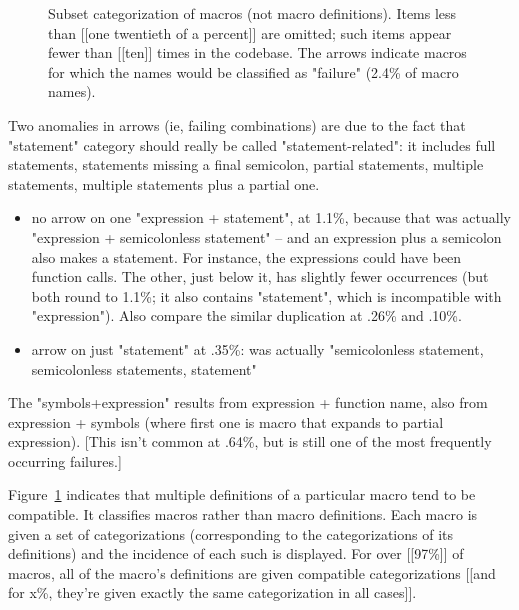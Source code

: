 \documentclass[10pt]{article}
\begin{document}
\begin{figure}
  {\small\centerline{}}
  \caption{Subset categorization of macros (not macro definitions).   Items
    less than [[one twentieth of a percent]] are omitted; such items appear
    fewer than [[ten]] times in the codebase.
    The arrows indicate macros for which the names would be classified
    as "failure" (2.4\% of macro names).}
  \label{fig:subset-categories}
\end{figure}

Two anomalies in arrows (ie, failing combinations) are due to the fact that
"statement" category should really be called "statement-related": it
includes full statements, statements missing a final semicolon, partial
statements, multiple statements, multiple statements plus a partial one.
\begin{itemize}
\item
  no arrow on one "expression + statement", at 1.1\%, because that was
  actually "expression + semicolonless statement" -- and an expression plus
  a semicolon also makes a statement.  For instance, the expressions could
  have been function calls.  The other, just below it, has slightly fewer
  occurrences (but both round to 1.1\%; it also contains "statement", which
  is incompatible with "expression").  Also compare the similar duplication
  at .26\% and .10\%.
\item
  arrow on just "statement" at .35\%: was actually "semicolonless
  statement, semicolonless statements, statement"
\end{itemize}

        The "symbols+expression" results from expression + function name,
          also from expression + symbols (where first one is macro that expands
          to partial expression).  [This isn't common at .64\%, but is still
          one of the most frequently occurring failures.]



        Figure~\ref{fig:subset-categories} indicates that multiple definitions of a
        particular macro tend to be compatible.  It classifies macros rather than
        macro definitions.  Each macro is
        given a set of categorizations (corresponding to the categorizations of its
        definitions) and the incidence of each such is displayed.  For over [[97\%]] of
        macros, all of the macro's definitions are given compatible
        categorizations [[and for x\%, they're given exactly the same
        categorization in all cases]].
\end{document}
